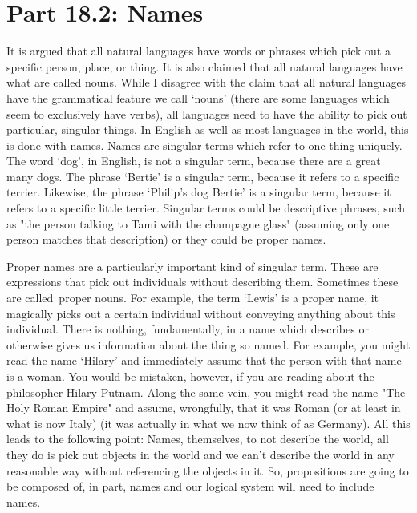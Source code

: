 \section{Part 18.2: Names}
It is argued that all natural languages have words or phrases which pick out a specific person, place, or thing. It is also claimed that all natural languages have what are called nouns. While I disagree with the claim that all natural languages have the grammatical feature we call ‘nouns' (there are some languages which seem to exclusively have verbs), all languages need to have the ability to pick out particular, singular things. In English as well as most languages in the world, this is done with \glspl{name}. Names are singular terms which refer to one thing uniquely. The word ‘dog’, in English, is not a singular term, because there are a great many dogs. The phrase ‘Bertie’ is a singular term, because it refers to a specific terrier. Likewise, the phrase ‘Philip’s dog Bertie’ is a singular term, because it refers to a specific little terrier. Singular terms could be descriptive phrases, such as "the person talking to Tami with the champagne glass" (assuming only one person matches that description) or they could be proper names.

Proper names are a particularly important kind of singular term. These are expressions that pick out individuals without describing them. Sometimes these are called proper nouns. For example, the term ‘Lewis' is a proper name, it magically picks out a certain individual without conveying anything about this individual. There is nothing, fundamentally, in a name which describes or otherwise gives us information about the thing so named. For example, you might read the name ‘Hilary' and immediately assume that the person with that name is a woman. You would be mistaken, however, if you are reading about the philosopher Hilary Putnam. Along the same vein, you might read the name "The Holy Roman Empire" and assume, wrongfully, that it was Roman (or at least in what is now Italy) (it was actually in what we now think of as Germany). All this leads to the following point: Names, themselves, to not describe the world, all they do is pick out objects in the world and we can't describe the world in any reasonable way without referencing the objects in it. So, propositions are going to be composed of, in part, names and our logical system will need to include names.

